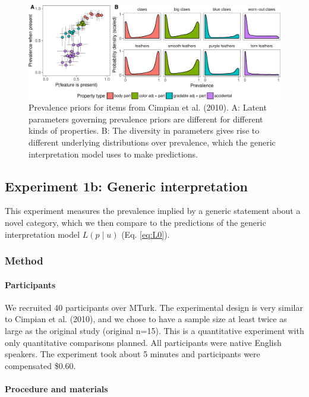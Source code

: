 \documentclass[floatsintext,doc]{apa6}
\theoremstyle{definition}
\theoremstyle{definition}
\theoremstyle{definition}
\theoremstyle{remark}
\begin{document}
\begin{figure}
\centering
\includegraphics{genint_files/figure-latex/cimpian-prevPrior-1.pdf}
\caption{\label{fig:cimpian-prevPrior}Prevalence priors for items from
Cimpian et al. (2010). A: Latent parameters governing prevalence priors
are different for different kinds of properties. B: The diversity in
parameters gives rise to different underlying distributions over
prevalence, which the generic interpretation model uses to make
predictions.}
\end{figure}

\subsection{Experiment 1b: Generic
interpretation}\label{experiment-1b-generic-interpretation}

This experiment measures the prevalence implied by a generic statement
about a novel category, which we then compare to the predictions of the
generic interpretation model \(L(p \mid u)\) (Eq. \ref{eq:L0}).

\subsubsection{Method}\label{method-1}

\paragraph{Participants}\label{participants-1}

We recruited 40 participants over MTurk. The experimental design is very
similar to Cimpian et al. (2010), and we chose to have a sample size at
least twice as large as the original study (original n=15). This is a
quantitative experiment with only quantitative comparisons planned. All
participants were native English speakers. The experiment took about 5
minutes and participants were compensated \$0.60.

\paragraph{Procedure and materials}\label{procedure-and-materials-1}
\end{document}
